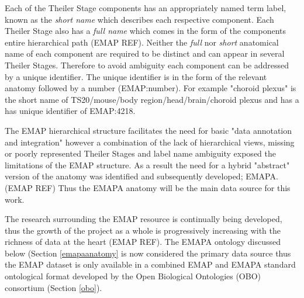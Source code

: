 Each of the Theiler Stage components has an appropriately named term label, known as the \textit{short name} which describes each respective component. Each Theiler Stage also has a \textit{full name} which comes in the form of the components entire hierarchical path (EMAP REF). Neither the \textit{full} nor \textit{short} anatomical name of each component are required to be distinct and can appear in several Theiler Stages. Therefore to avoid ambiguity each component can be addressed by a unique identifier. The unique identifier is in the form of the relevant anatomy followed by a number (EMAP:number). For example "choroid plexus" is the short name of TS20/mouse/body region/head/brain/choroid plexus and has a has unique identifier of EMAP:4218.

The EMAP hierarchical structure facilitates the need for basic "data annotation and integration" however a combination of the lack of hierarchical views, missing or poorly represented Theiler Stages and label name ambiguity exposed the limitations of the EMAP structure. As a result the need for a hybrid "abstract" version of the anatomy was identified and subsequently developed; EMAPA. (EMAP REF) Thus the EMAPA anatomy will be the main data source for this work.

The research surrounding the EMAP resource is continually being developed, thus the growth of the project as a whole is progressively increasing with the richness of data at the heart (EMAP REF). The EMAPA ontology discussed below (Section \ref{emapaanatomy} is now considered the primary data source thus the EMAP dataset is only available in a combined EMAP and EMAPA standard ontological format developed by the Open Biological Ontologies (OBO) consortium (Section \ref{obo}).


